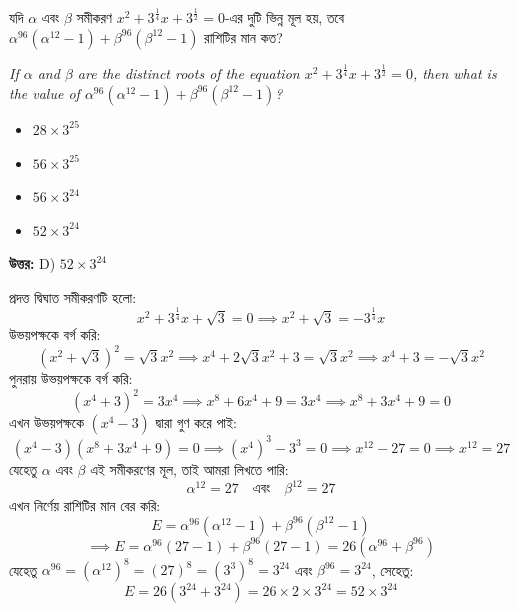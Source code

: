 \documentclass[12pt, a4paper]{article}
\begin{document}
\begin{tcolorbox}[questionbox={প্রশ্ন (Question) 35}]
    \noindent
    যদি $\alpha$ এবং $\beta$ সমীকরণ $x^2 + 3^{\frac{1}{4}}x + 3^{\frac{1}{2}} = 0$-এর দুটি ভিন্ন মূল হয়, তবে $\alpha^{96}(\alpha^{12}-1) + \beta^{96}(\beta^{12}-1)$ রাশিটির মান কত?
    
    \vspace{0.8em}
    \begin{english}
    \noindent\textit{\color{darkgray}
    If $\alpha$ and $\beta$ are the distinct roots of the equation $x^2 + 3^{\frac{1}{4}}x + 3^{\frac{1}{2}} = 0$, then what is the value of $\alpha^{96}(\alpha^{12}-1) + \beta^{96}(\beta^{12}-1)$?
    }
    \end{english}
\end{tcolorbox}

\begin{itemize}[label={}, leftmargin=1cm, itemsep=0.5em]
    \item[\textbf{A)}] $28 \times 3^{25}$
    \item[\textbf{B)}] $56 \times 3^{25}$
    \item[\textbf{C)}] $56 \times 3^{24}$
    \item[\textbf{D)}] $52 \times 3^{24}$
\end{itemize}

\vspace{0.5em}
\begin{tcolorbox}[answerbox]
    \textbf{\color{success} উত্তর:} D) $52 \times 3^{24}$
\end{tcolorbox}
\vspace{1em}

\begin{tcolorbox}[solutionbox={সমাধান (Solution)}]
    \noindent
    প্রদত্ত দ্বিঘাত সমীকরণটি হলো:
    \[ x^2 + 3^{\frac{1}{4}}x + \sqrt{3} = 0 \implies x^2 + \sqrt{3} = -3^{\frac{1}{4}}x \]
    উভয়পক্ষকে বর্গ করি:
    \[ (x^2 + \sqrt{3})^2 = \sqrt{3}x^2 \implies x^4 + 2\sqrt{3}x^2 + 3 = \sqrt{3}x^2 \implies x^4 + 3 = -\sqrt{3}x^2 \]
    পুনরায় উভয়পক্ষকে বর্গ করি:
    \[ (x^4 + 3)^2 = 3x^4 \implies x^8 + 6x^4 + 9 = 3x^4 \implies x^8 + 3x^4 + 9 = 0 \]
    এখন উভয়পক্ষকে $(x^4 - 3)$ দ্বারা গুণ করে পাই:
    \[ (x^4 - 3)(x^8 + 3x^4 + 9) = 0 \implies (x^4)^3 - 3^3 = 0 \implies x^{12} - 27 = 0 \implies x^{12} = 27 \]
    যেহেতু $\alpha$ এবং $\beta$ এই সমীকরণের মূল, তাই আমরা লিখতে পারি:
    \[ \alpha^{12} = 27 \quad \text{এবং} \quad \beta^{12} = 27 \]
    এখন নির্ণেয় রাশিটির মান বের করি:
    \[ E = \alpha^{96}(\alpha^{12}-1) + \beta^{96}(\beta^{12}-1) \]
    \[ \implies E = \alpha^{96}(27-1) + \beta^{96}(27-1) = 26(\alpha^{96} + \beta^{96}) \]
    যেহেতু $\alpha^{96} = (\alpha^{12})^8 = (27)^8 = (3^3)^8 = 3^{24}$ এবং $\beta^{96} = 3^{24}$, সেহেতু:
    \[ E = 26(3^{24} + 3^{24}) = 26 \times 2 \times 3^{24} = 52 \times 3^{24} \]
\end{tcolorbox}
\end{document}
